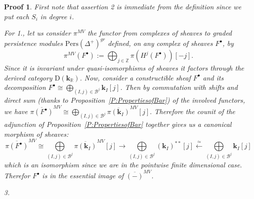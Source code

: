 \documentclass[a4paper, english, 11pt]{article}
\newcommand{\kk}[0]{\textbf{k}}
\newcommand{\Pe}{\text{Pers}}
\newcommand{\0}{\vec{0}}
\newcommand{\R}[0]{\mathbb{R}}
\newcommand{\Z}[0]{\mathbb{Z}}
\newcommand{\D}[0]{\text{D}}
\newtheorem*{pf}{Proof} }
\begin{document}
\begin{pf}
First note that assertion 2 is immediate from the definition since we put each $S_i$ in degree $i$.   

\smallskip

For 1., let us consider  $\pi^{MV}$ the functor from complexes of sheaves to graded persistence modules $\Pe(\Delta^+)^{gr}$ defined, on any complex of sheaves $F^\bullet$, by 
\begin{equation}\pi^{MV}(F^\bullet) := \bigoplus_{j\in \Z} \pi (H^j(F^\bullet))[-j] .\end{equation}
Since it is invariant under quasi-isomorphisms of sheaves it  factors through the derived category $\D(\kk_\R)$. Now, consider a constructible sheaf $F^\bullet$ and its decomposition $F^\bullet\cong \bigoplus\limits_{(I,j)\in \mathcal{B}^j} \kk_I [j]$. Then by commutation with shifts and direct sum (thanks to Proposition~\ref{P:PropertiesofBar}) of the involved functors,  we have 
$\overline{\pi(F^\bullet)}^{MV} \cong  \bigoplus\limits_{(I,j)\in \mathcal{B}^j} \overline{\pi(\kk_I)}^{MV}[j].$ 
Therefore the counit of the adjunction of Proposition~\ref{P:PropertiesofBar} together gives us a canonical morphism of sheaves:
$$\overline{\pi(F^\bullet)}^{MV} \cong \bigoplus\limits_{(I,j)\in \mathcal{B}^j} \overline{\pi(\kk_I)}^{MV}[j] \longrightarrow
\bigoplus\limits_{(I,j)\in \mathcal{B}^j}(\kk_I)^{**} [j] 
\stackrel{\simeq}\longleftarrow \bigoplus\limits_{(I,j)\in \mathcal{B}^j}\kk_I [j]$$ 
which is an isomorphism since we are in the pointwise finite dimensional case.
Therefor $F^\bullet$ is in the essential image of $\overline{(-)}^{MV}$.

3.


\end{pf}
\end{document}
